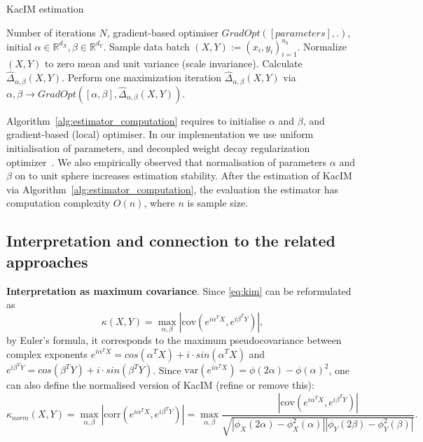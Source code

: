 \documentclass{article}
\newcommand{\cov}{\mathrm{cov}}
\newcommand{\corr}{\mathrm{corr}}
\newcommand{\var}{\mathrm{var}}
\begin{document}
\begin{algorithm}
	\caption{KacIM estimation}\label{alg:estimator_computation}
	\begin{algorithmic}
		\Require Number of iterations $N$, gradient-based optimiser $GradOpt([parameters],.)$, initial $\alpha \in \mathbb{R}^{d_{X}}, \beta \in \mathbb{R}^{d_{Y}}$.
		\State Sample data batch $(X,Y):=(x_{i},y_{i})_{i=1}^{n_{b}}$.
		\State Normalize $(X,Y)$ to zero mean and unit variance (scale invariance).
		\State Calculate  $\widehat{\Delta}_{\alpha, \beta}(X,Y)$.
		\State Perform one maximization iteration $\widehat{\Delta}_{\alpha, \beta}(X,Y)$ via $\alpha, \beta \rightarrow GradOpt([\alpha, \beta], \widehat{\Delta}_{\alpha, \beta}(X,Y))$.
		\EndFor
	\end{algorithmic}
\end{algorithm}



Algorithm~\ref{alg:estimator_computation} requires to initialise $\alpha$ and $\beta$, and gradient-based (local) optimiser. In our implementation we use uniform initialisation of parameters, and decoupled weight decay regularization optimizer~\cite{Loshchilov2019DecoupledWD}. 
We also empirically observed that normalisation of parameters $\alpha$ and $\beta$ on to unit sphere increases estimation stability. After the estimation of KacIM via Algorithm~\ref{alg:estimator_computation}, the evaluation the estimator  has computation complexity $O(n)$, where $n$ is sample size.



\subsection{Interpretation and connection to the related approaches}
\textbf{Interpretation as maximum covariance}. Since \eqref{eq:kim} can be reformulated as
\begin{equation}
\kappa(X,Y) = \max_{\alpha,\beta} |\cov(e^{i\alpha^{T}X},e^{i\beta^{T}Y})|,
\end{equation}
by Euler's formula, it corresponds to the maximum pseudocovariance between complex exponents $e^{i\alpha^{T}X} = cos(\alpha^{T}X) + i \cdot sin(\alpha^{T}X)$ and $e^{i\beta^{T}Y} = cos(\beta^{T}Y) + i \cdot sin(\beta^{T}Y)$.
Since $\var(e^{i\alpha^{T}X}) = \phi(2\alpha) - \phi(\alpha)^2$, one can also define the normalised version of KacIM (refine or remove this):
\begin{equation}
\kappa_{norm}(X,Y) = \max_{\alpha,\beta} |\corr(e^{i\alpha^{T}X},e^{i\beta^{T}Y})| = \max_{\alpha,\beta}  \frac{|\cov(e^{i\alpha^{T}X},e^{i\beta^{T}Y})|}{\sqrt{|\phi_{X}(2\alpha)-\phi_{X}^{2}(\alpha)||\phi_{Y}(2\beta)-\phi_{Y}^{2}(\beta)|}}.
\end{equation}
\end{document}
